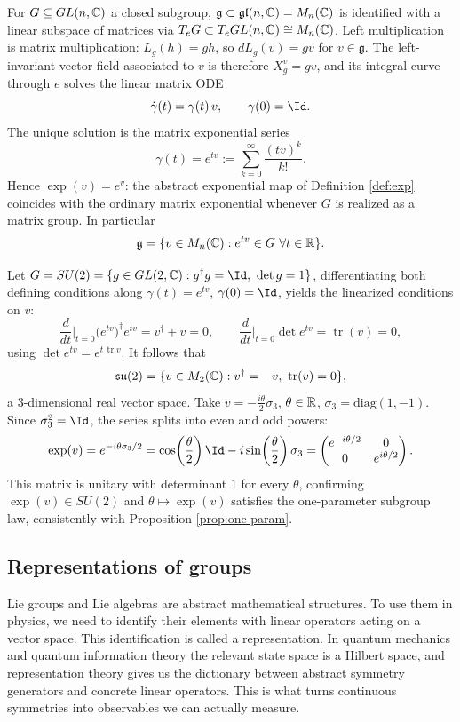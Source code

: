 \begin{remark}
	For $G \subseteq GL(n,\mathbb{C})$ a closed subgroup, $\mathfrak g \subset \mathfrak{gl}(n,\mathbb{C}) = M_n(\mathbb{C})$ is identified with a linear subspace of matrices via $T_eG \subset T_eGL(n,\mathbb{C}) \cong M_n(\mathbb{C})$. Left multiplication is matrix multiplication: $L_g(h) = gh$, so $dL_g(v) = gv$ for $v \in \mathfrak g$. The left-invariant vector field associated to $v$ is therefore $X^v_g = gv$, and its integral curve through $e$ solves the linear matrix ODE
	\[
	\dot\gamma(t) = \gamma(t)\, v, \qquad \gamma(0) = \Id.
	\]
	The unique solution is the matrix exponential series
	\[
	\gamma(t) = e^{tv} := \sum_{k=0}^\infty \frac{(tv)^k}{k!}.
	\]
	Hence $\exp(v) = e^{v}$: the abstract exponential map of Definition \ref{def:exp} coincides with the ordinary matrix exponential whenever $G$ is realized as a matrix group. In particular
	\[
	\mathfrak g = \{v \in M_n(\C) : e^{tv} \in G \ \forall t \in \R\}.
	\]
\end{remark}

\begin{example}
	Let $G = SU(2) = \{g \in GL(2,\C) : g^\dagger g = \Id,\ \det g = 1\}$, differentiating both defining conditions along $\gamma(t) = e^{tv}$, $\gamma(0)= \Id$, yields the linearized conditions on $v$:
	\[
	\frac{d}{dt}\Big|_{t=0} \big(e^{tv}\big)^\dagger e^{tv} = v^\dagger + v = 0, \qquad
	\frac{d}{dt}\Big|_{t=0} \det e^{tv} = \operatorname{tr}(v) = 0,
	\]
	using $\det e^{tv} = e^{t\,\operatorname{tr} v}$. It follows that
	\[
	\mathfrak{su}(2) = \{v \in M_2(\mathbb{C}) : v^\dagger = -v,\ \operatorname{tr}(v) = 0\},
	\]
	a $3$-dimensional real vector space. Take $v = -\tfrac{i\theta}{2}\sigma_3$, $\theta \in \mathbb{R}$, $\sigma_3 = \mathrm{diag}(1,-1)$. Since $\sigma_3^2 = \Id$, the series splits into even and odd powers:
	\[
	\exp(v) = e^{-i\theta\sigma_3/2} = \cos\!\left(\frac{\theta}{2}\right) \Id - i\sin\!\left(\frac{\theta}{2}\right)\sigma_3
	= \begin{pmatrix} e^{-i\theta/2} & 0 \\ 0 & e^{i\theta/2} \end{pmatrix}.
	\]
	This matrix is unitary with determinant $1$ for every $\theta$, confirming $\exp(v) \in SU(2)$ and $\theta \mapsto \exp(v)$ satisfies the one-parameter subgroup law, consistently with Proposition \ref{prop:one-param}. 
\end{example}


\subsection*{Representations of groups}
Lie groups and Lie algebras are abstract mathematical structures. To use them in physics, we need to identify their elements with linear operators acting on a vector space. This identification is called a representation. In quantum mechanics and quantum information theory the relevant state space is a Hilbert space, and representation theory gives us the dictionary between abstract symmetry generators and concrete linear operators. This is what turns continuous symmetries into observables we can actually measure. 

